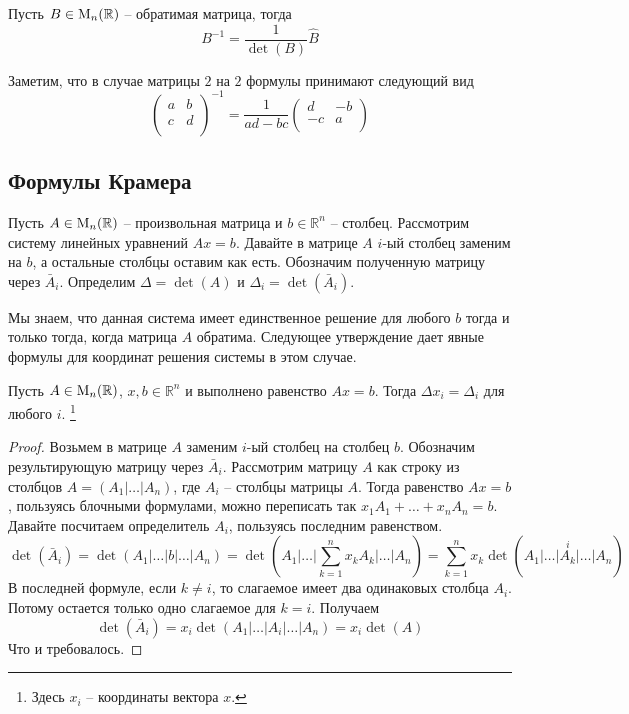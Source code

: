\begin{claim}
Пусть $B\in\operatorname{M}_{n}(\mathbb R)$ -- обратимая матрица, тогда 
\[
B^{-1} = \frac{1}{\det(B)}\hat B
\]
\end{claim}

Заметим, что в случае матрицы $2$ на $2$ формулы принимают следующий вид
\[
\begin{pmatrix}
{a}&{b}\\
{c}&{d}\\
\end{pmatrix}^{-1}
=
\frac{1}{ad - bc}
\begin{pmatrix}
{d}&{-b}\\
{-c}&{a}\\
\end{pmatrix}
\]


\subsection{Формулы Крамера}

Пусть $A\in\operatorname{M}_{n}(\mathbb R)$ -- произвольная матрица и $b\in\mathbb R^n$ -- столбец.
Рассмотрим систему линейных уравнений $Ax = b$.
Давайте в матрице $A$ $i$-ый столбец заменим на $b$, а остальные столбцы оставим как есть.
Обозначим полученную матрицу через $\bar A_i$.
Определим $\Delta = \det (A)$ и $\Delta_i = \det (\bar A_i)$.

Мы знаем, что данная система имеет единственное решение для любого $b$ тогда и только тогда, когда матрица $A$ обратима.
Следующее утверждение дает явные формулы для координат решения системы в этом случае.

\begin{claim}
Пусть $A\in\operatorname{M}_{n}(\mathbb R)$, $x,b\in \mathbb R^n$ и выполнено равенство $Ax = b$.
Тогда $\Delta x_i = \Delta_i$ для любого $i$.%
\footnote{Здесь $x_i$ -- координаты вектора $x$.}
\end{claim}
\begin{proof}
Возьмем в матрице $A$ заменим $i$-ый столбец на столбец $b$.
Обозначим результирующую матрицу через $\bar A_i$.
Рассмотрим матрицу $A$ как строку из столбцов $A = (A_1|\ldots|A_n)$, где $A_i$ -- столбцы матрицы $A$.
Тогда равенство $Ax = b$, пользуясь блочными формулами, можно переписать так $x_1 A_1 + \ldots + x_n A_n = b$.
Давайте посчитаем определитель $A_i$, пользуясь последним равенством. 
\[
\det (\bar A_i) = \det(A_1|\ldots|b|\ldots|A_n) = \det(A_1|\ldots|\sum_{k=1}^n x_k A_k|\ldots|A_n) = \sum_{k=1}^n x_k \det (
\stackrel{i}{A_1|\ldots|A_k|\ldots|A_n})
\]
В последней формуле, если $k\neq i$, то слагаемое имеет два одинаковых столбца $A_i$.
Потому остается только одно слагаемое для $k = i$.
Получаем
\[
\det(\bar A_i) = x_i \det(A_1|\ldots|A_i|\ldots|A_n) = x_i \det(A)
\]
Что и требовалось.
\end{proof}

